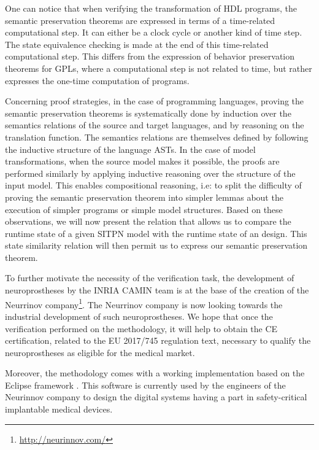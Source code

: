 \documentclass[pdflatex,sn-mathphys]{sn-jnl}%
\theoremstyle{thmstyleone}%
\theoremstyle{thmstyletwo}%
\theoremstyle{thmstylethree}%
\begin{document}
One can notice that when verifying the transformation of HDL programs,
the semantic preservation theorems are expressed in terms of a
time-related computational step. It can either be a clock cycle or
another kind of time step. The state equivalence checking is made at
the end of this time-related computational step. This differs from the
expression of behavior preservation theorems for GPLs, where a
computational step is not related to time, but rather expresses the
one-time computation of programs.

Concerning proof strategies, in the case of programming languages,
proving the semantic preservation theorems is systematically done by
induction over the semantics relations of the source and target
languages, and by reasoning on the translation function. The semantics
relations are themselves defined by following the inductive structure
of the language ASTs. In the case of model transformations, when the
source model makes it possible, the proofs are performed similarly by
applying inductive reasoning over the structure of the input model.
This enables compositional reasoning, i.e: to split the difficulty of
proving the semantic preservation theorem into simpler lemmas about
the execution of simpler programs or simple model structures.  %
Based on these observations, we will now present the relation that
allows us to compare the runtime state of a given SITPN model with the
runtime state of an \hvhdl{} design. This state similarity relation
will then permit us to express our semantic preservation theorem.


To further motivate the necessity of the verification task, the
development of neuroprostheses by the INRIA CAMIN team is at the base
of the creation of the Neurrinov
company\footnote{\url{http://neurinnov.com/}}. The Neurrinov company
is now looking towards the industrial development of such
neuroprostheses. We hope that once the verification performed on the
\hilecop{} methodology, it will help to obtain the CE certification,
related to the EU 2017/745 regulation text, necessary to qualify the
neuroprostheses as eligible for the medical market.

Moreover, the \hilecop{} methodology comes with a working
implementation based on the Eclipse framework . This software is
currently used by the engineers of the Neurinnov company to design the
digital systems having a part in safety-critical implantable medical
devices.
\end{document}
